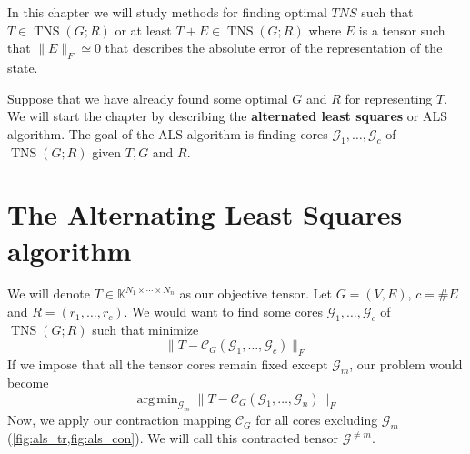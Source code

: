 \documentclass[11pt,a4paper,openright,oneside]{book}
\numberwithin{equation}{section}
\newcommand{\figref}[1]{\cref{#1}}
\DeclareMathOperator{\TNS}{TNS}
\DeclareMathOperator*{\argmin}{arg\,min}
\begin{document}
{In this chapter we will study methods for finding optimal $TNS$ such that $T \in \TNS(G; R)$ or at least
$T + E \in \TNS(G; R)$ where $E$ is a tensor such that $\|E\|_F \simeq 0$ that describes the absolute error of the representation
of the state.

Suppose that we have already found some optimal $G$ and $R$ for representing $T$. We will 
start the chapter by describing the \textbf{alternated least squares} or ALS
algorithm. The goal of the ALS algorithm is finding cores $\mathcal{G}_1, \dots, \mathcal{G}_c$ of $\TNS(G; R)$ given $T, G$ and $R$.


\section{The Alternating Least Squares algorithm}

\nocite{malikSamplingBasedDecompositionAlgorithms2022a}

We will denote $T \in \mathbb{K}^{N_1 \times \cdots \times N_n}$ as our objective tensor. Let $G = (V, E)$, $c = \#E$ and $R = (r_1, \dots, r_c)$.
We would want to find some cores
$\mathcal{G}_1, \dots, \mathcal{G}_c$ of $\TNS(G; R)$ such that minimize
$$\|T - \mathcal{C}_G (\mathcal{G}_1, \dots, \mathcal{G}_c)\|_F$$
If we impose that all the tensor cores remain fixed except $\mathcal{G}_m$, our problem would become
$$\argmin_{\mathcal{G}_m} \|T - \mathcal{C}_G(\mathcal{G}_1, \dots, \mathcal{G}_n)\|_F$$
Now, we apply our contraction mapping $\mathcal{C}_G$ for all cores excluding $\mathcal{G}_m$ (\figref{fig:als_tr,fig:als_con}).
We will call this contracted tensor $\mathcal{G}^{\neq m}$. 

\begin{figure}[H]

    \centering
   \begin{minipage}{0\textwidth}
\end{minipage}
\end{figure}}
\end{document}
